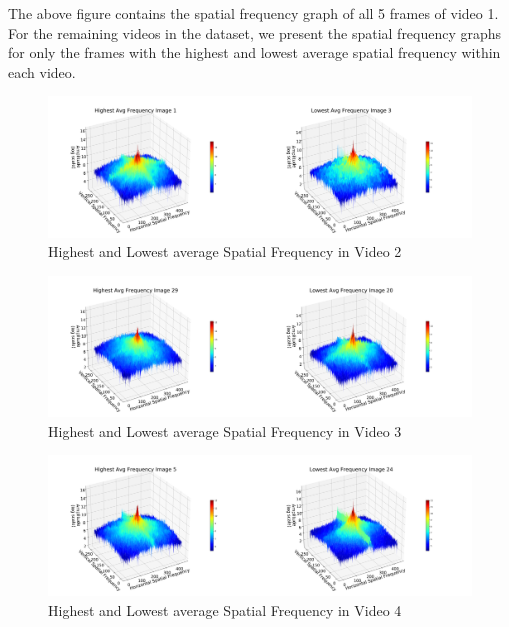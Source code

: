 \documentclass{ioereport}
\begin{document}
The above figure contains the spatial frequency graph of all 5 frames of video 1. For the remaining videos in the dataset, we present the spatial frequency graphs for only the frames with the highest and lowest average spatial frequency within each video.

\begin{figure}[H]
    \centering
    \includegraphics[width=\linewidth]{assets/spatial_frequency/video2spatialfreq.png}
    \caption{Highest and Lowest average Spatial Frequency in Video 2}
    \label{fig:spatial-frequency-2}
\end{figure}

\begin{figure}[H]
    \centering
    \includegraphics[width=\linewidth]{assets/spatial_frequency/video3spatialfreq.png}
    \caption{Highest and Lowest average Spatial Frequency in Video 3}
    \label{fig:spatial-frequency-3}
\end{figure}

\begin{figure}[H]
    \centering
    \includegraphics[width=\linewidth]{assets/spatial_frequency/video4spatialfreq.png}
    \caption{Highest and Lowest average Spatial Frequency in Video 4}
    \label{fig:spatial-frequency-4}
\end{figure}
\end{document}
